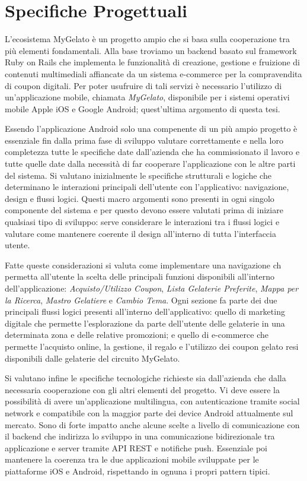 
\chapter{Specifiche Progettuali}

L'ecosistema MyGelato è un progetto ampio che si basa sulla cooperazione
tra più elementi fondamentali. Alla base troviamo un backend basato
sul framework Ruby on Rails che implementa le funzionalità di creazione,
gestione e fruizione di contenuti multimediali affiancate da un sistema
e-commerce per la compravendita di coupon digitali. Per poter usufruire
di tali servizi è necessario l'utilizzo di un'applicazione mobile,
chiamata \emph{MyGelato}, disponibile per i sistemi operativi mobile
Apple iOS e Google Android; quest'ultima argomento di questa tesi.\bigskip{}

Essendo l'applicazione Android solo una compenente di un più ampio
progetto è essenziale fin dalla prima fase di sviluppo valutare correttamente
e nella loro completezza tutte le specifiche date dall'azienda che
ha commissionato il lavoro e tutte quelle date dalla necessità di
far cooperare l'applicazione con le altre parti del sistema. Si valutano
inizialmente le specifiche strutturali e logiche che determinano le
interazioni principali dell'utente con l'applicativo: navigazione,
design e flussi logici. Questi macro argomenti sono presenti in ogni
singolo componente del sistema e per questo devono essere valutati
prima di iniziare qualsiasi tipo di sviluppo: serve considerare le
interazioni tra i flussi logici e valutare come mantenere coerente
il design all'interno di tutta l'interfaccia utente.\bigskip{}

Fatte queste considerazioni si valuta come implementare una navigazione
ch permetta all'utente la scelta delle principali funzioni disponibili
all'interno dell'applicazione: \textit{Acquisto/Utilizzo Coupon},
\textit{Lista Gelaterie Preferite}, \textit{Mappa per la Ricerca},
\textit{Mastro Gelatiere} e \textit{Cambio Tema}. Ogni sezione fa
parte dei due principali flussi logici presenti all'interno dell'applicativo:
quello di marketing digitale che permette l'esplorazione da parte
dell'utente delle gelaterie in una determinata zona e delle relative
promozioni; e quello di e-commerce che permette l'acquisto online,
la gestione, il regalo e l'utilizzo dei coupon gelato resi disponibili
dalle gelaterie del circuito MyGelato.\bigskip{}

Si valutano infine le specifiche tecnologiche richieste sia dall'azienda
che dalla necessaria cooperazione con gli altri elementi del progetto.
Vi deve essere la possibilità di avere un'applicazione multilingua,
con autenticazione tramite social network e compatibile con la maggior
parte dei device Android attualmente sul mercato. Sono di forte impatto
anche alcune scelte a livello di comunicazione con il backend che
indirizza lo sviluppo in una comunicazione bidirezionale tra applicazione
e server tramite API REST e notifiche push. Essenziale poi mantenere
la coerenza tra le due applicazioni mobile sviluppate per le piattaforme
iOS e Android, rispettando in ognuna i propri pattern tipici.

